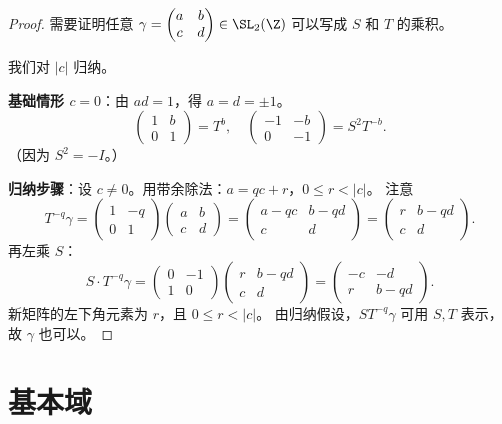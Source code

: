 \begin{proof}
需要证明任意 $\gamma = \begin{pmatrix} a & b \\ c & d \end{pmatrix} \in \SL_2(\Z)$
可以写成 $S$ 和 $T$ 的乘积。

我们对 $|c|$ 归纳。

\textbf{基础情形 $c = 0$}：由 $ad = 1$，得 $a = d = \pm 1$。
\[
  \begin{pmatrix} 1 & b \\ 0 & 1 \end{pmatrix} = T^b, \quad
  \begin{pmatrix} -1 & -b \\ 0 & -1 \end{pmatrix} = S^2 T^{-b}.
\]
（因为 $S^2 = -I$。）

\textbf{归纳步骤}：设 $c \neq 0$。用带余除法：$a = qc + r$，$0 \leq r < |c|$。
注意
\[
  T^{-q} \gamma
  = \begin{pmatrix} 1 & -q \\ 0 & 1 \end{pmatrix}
    \begin{pmatrix} a & b \\ c & d \end{pmatrix}
  = \begin{pmatrix} a - qc & b - qd \\ c & d \end{pmatrix}
  = \begin{pmatrix} r & b-qd \\ c & d \end{pmatrix}.
\]
再左乘 $S$：
\[
  S \cdot T^{-q} \gamma
  = \begin{pmatrix} 0 & -1 \\ 1 & 0 \end{pmatrix}
    \begin{pmatrix} r & b-qd \\ c & d \end{pmatrix}
  = \begin{pmatrix} -c & -d \\ r & b-qd \end{pmatrix}.
\]
新矩阵的左下角元素为 $r$，且 $0 \leq r < |c|$。
由归纳假设，$ST^{-q}\gamma$ 可用 $S, T$ 表示，故 $\gamma$ 也可以。
\end{proof}


\section{基本域}
\label{sec:fundamental-domain}

